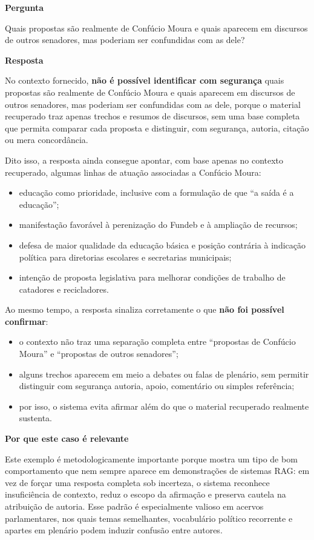 \textbf{Pergunta}

Quais propostas são realmente de Confúcio Moura e quais aparecem em discursos de outros senadores, mas poderiam ser confundidas com as dele?

\textbf{Resposta}

No contexto fornecido, \textbf{não é possível identificar com segurança} quais propostas são realmente de Confúcio Moura e quais aparecem em discursos de outros senadores, mas poderiam ser confundidas com as dele, porque o material recuperado traz apenas trechos e resumos de discursos, sem uma base completa que permita comparar cada proposta e distinguir, com segurança, autoria, citação ou mera concordância.

Dito isso, a resposta ainda consegue apontar, com base apenas no contexto recuperado, algumas linhas de atuação associadas a Confúcio Moura:

\begin{itemize}
  \item educação como prioridade, inclusive com a formulação de que ``a saída é a educação'';
  \item manifestação favorável à perenização do Fundeb e à ampliação de recursos;
  \item defesa de maior qualidade da educação básica e posição contrária à indicação política para diretorias escolares e secretarias municipais;
  \item intenção de proposta legislativa para melhorar condições de trabalho de catadores e recicladores.
\end{itemize}

Ao mesmo tempo, a resposta sinaliza corretamente o que \textbf{não foi possível confirmar}:

\begin{itemize}
  \item o contexto não traz uma separação completa entre ``propostas de Confúcio Moura'' e ``propostas de outros senadores'';
  \item alguns trechos aparecem em meio a debates ou falas de plenário, sem permitir distinguir com segurança autoria, apoio, comentário ou simples referência;
  \item por isso, o sistema evita afirmar além do que o material recuperado realmente sustenta.
\end{itemize}

\textbf{Por que este caso é relevante}

Este exemplo é metodologicamente importante porque mostra um tipo de bom comportamento que nem sempre aparece em demonstrações de sistemas RAG: em vez de forçar uma resposta completa sob incerteza, o sistema reconhece insuficiência de contexto, reduz o escopo da afirmação e preserva cautela na atribuição de autoria. Esse padrão é especialmente valioso em acervos parlamentares, nos quais temas semelhantes, vocabulário político recorrente e apartes em plenário podem induzir confusão entre autores.

